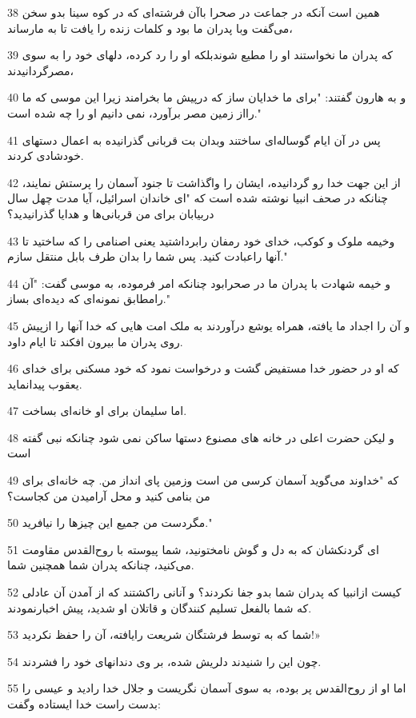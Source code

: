 \par 38 همین است آنکه در جماعت در صحرا باآن فرشته‌ای که در کوه سینا بدو سخن می‌گفت وبا پدران ما بود و کلمات زنده را یافت تا به مارساند،
\par 39 که پدران ما نخواستند او را مطیع شوندبلکه او را رد کرده، دلهای خود را به سوی مصرگردانیدند،
\par 40 و به هارون گفتند: "برای ما خدایان ساز که در‌پیش ما بخرامند زیرا این موسی که ما رااز زمین مصر برآورد، نمی دانیم او را چه شده است."
\par 41 پس در آن ایام گوساله‌ای ساختند وبدان بت قربانی گذرانیده به اعمال دستهای خودشادی کردند.
\par 42 از این جهت خدا رو گردانیده، ایشان را واگذاشت تا جنود آسمان را پرستش نمایند، چنانکه در صحف انبیا نوشته شده است که "ای خاندان اسرائیل، آیا مدت چهل سال دربیابان برای من قربانی‌ها و هدایا گذرانیدید؟
\par 43 وخیمه ملوک و کوکب، خدای خود رمفان رابرداشتید یعنی اصنامی را که ساختید تا آنها راعبادت کنید. پس شما را بدان طرف بابل منتقل سازم."
\par 44 و خیمه شهادت با پدران ما در صحرابود چنانکه امر فرموده، به موسی گفت: "آن رامطابق نمونه‌ای که دیده‌ای بساز."
\par 45 و آن را اجداد ما یافته، همراه یوشع درآوردند به ملک امت هایی که خدا آنها را ازپیش روی پدران ما بیرون افکند تا ایام داود.
\par 46 که او در حضور خدا مستفیض گشت و درخواست نمود که خود مسکنی برای خدای یعقوب پیدانماید.
\par 47 اما سلیمان برای او خانه‌ای بساخت.
\par 48 و لیکن حضرت اعلی در خانه های مصنوع دستها ساکن نمی شود چنانکه نبی گفته است
\par 49 که "خداوند می‌گوید آسمان کرسی من است وزمین پای انداز من. چه خانه‌ای برای من بنامی کنید و محل آرامیدن من کجاست؟
\par 50 مگردست من جمیع این چیزها را نیافرید."
\par 51 ‌ای گردنکشان که به دل و گوش نامختونید، شما پیوسته با روح‌القدس مقاومت می‌کنید، چنانکه پدران شما همچنین شما.
\par 52 کیست ازانبیا که پدران شما بدو جفا نکردند؟ و آنانی راکشتند که از آمدن آن عادلی که شما بالفعل تسلیم کنندگان و قاتلان او شدید، پیش اخبارنمودند.
\par 53 شما که به توسط فرشتگان شریعت رایافته، آن را حفظ نکردید!»
\par 54 چون این را شنیدند دلریش شده، بر وی دندانهای خود را فشردند.
\par 55 اما او از روح‌القدس پر بوده، به سوی آسمان نگریست و جلال خدا رادید و عیسی را بدست راست خدا ایستاده وگفت:
